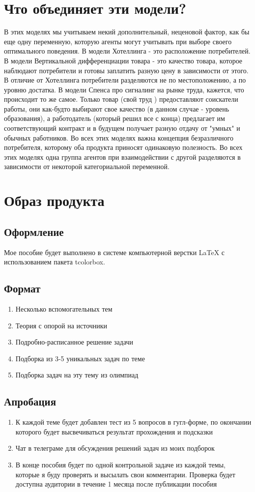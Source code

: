 \section{Что объединяет эти модели?}
В этих моделях мы учитываем некий дополнительный, неценовой фактор, как бы еще одну переменную, которую агенты могут
учитывать при выборе своего оптимального поведения. В модели Хотеллинга - это расположение потребителей. В модели
Вертикальной дифференциации товара - это качество товара, которое наблюдают потребители и готовы заплатить разную
цену в зависимости от этого. В отличие от Хотеллинга потребители разделяются не по местоположению, а по уровню
достатка. В модели Спенса про сигналинг на рынке труда, кажется, что происходит то же самое. Только товар (свой труд
) предоставляют соискатели работы, они как-будто выбирают свое качество (в данном случае - уровень образования), а
работодатель (который решил все с конца) предлагает им соответствующий контракт и в будущем получает разную отдачу от
"умных" и обычных работников. Во всех этих моделях важна концепция безразличного потребителя, которому оба продукта
приносят одинаковую полезность. Во всех этих моделях одна группа агентов при взаимодействии с другой разделяются в
зависимости от некоторой категориальной переменной.

\section{Образ продукта}
\subsection{Оформление}
Мое пособие будет выполнено в системе компьютерной верстки LaTeX с использованием пакета tcolorbox.
\subsection{Формат}
\begin{enumerate}
    \item Несколько вспомогательных тем
    \item Теория с опорой на источники
    \item Подробно-расписанное решение задачи
    \item Подборка из 3-5 уникальных задач по теме
    \item Подборка задач на эту тему из олимпиад
\end{enumerate}
\subsection{Апробация}
\begin{enumerate}
    \item К каждой теме будет добавлен тест из 5 вопросов в гугл-форме, по окончании которого будет высвечиваться результат прохождения и подсказки
    \item Чат в телеграме для обсуждения решений задач из моих подборок
    \item В конце пособия будет по одной контрольной задаче из каждой темы, которые я буду проверять и высылать свои комментарии. Проверка будет доступна аудитории в течение 1 месяца после публикации пособия
\end{enumerate}
